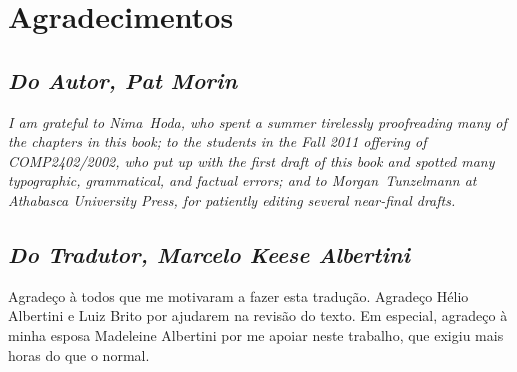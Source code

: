 \chapter*{Agradecimentos}

\section*{\emph{Do Autor, Pat Morin}}

\emph{I am grateful to Nima~Hoda, who spent a summer tirelessly proofreading
many of the chapters in this book; to the students in the Fall 2011
offering of COMP2402/2002, who put up with the first draft of this book
and spotted many typographic, grammatical, and factual errors; and to
Morgan~Tunzelmann at Athabasca University Press, for patiently editing
several near-final drafts.}

\section*{\emph{Do Tradutor, Marcelo Keese Albertini }}

Agradeço à todos que me motivaram a fazer esta tradução. Agradeço Hélio Albertini e Luiz Brito por ajudarem na revisão do texto.
Em especial, agradeço à minha esposa Madeleine Albertini por me apoiar neste trabalho, que exigiu mais horas do que o normal.

